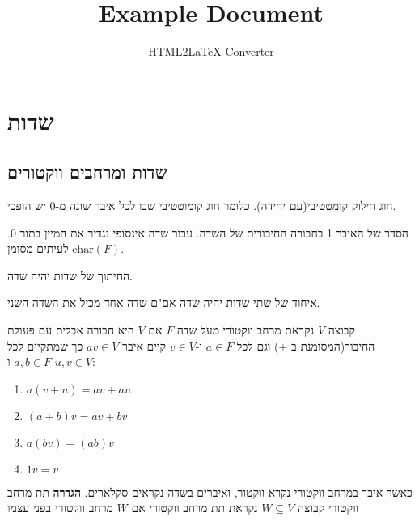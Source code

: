 \documentclass{tstextbook}
\begin{document}
\title{Example Document}
\author{HTML2LaTeX Converter}
\maketitle

\chapter{שדות}

\section{שדות ומרחבים ווקטורים}

\begin{definition}[שדה]
חוג חילוק קומטטיבי(עם יחידה). כלומר חוג קומוטטיבי שבו לכל איבר שונה מ-0 יש הופכי.

\end{definition}
\begin{definition}
הסדר של האיבר 1 בחבורה החיבורית של השדה. עבור שדה אינסופי נגדיר את המיין בתור 0. לעיתים מסומן \(\mathrm{char}(F)\).

\end{definition}
\begin{proposition}
החיתוך של שדות יהיה שדה.

\end{proposition}
\begin{proposition}
איחוד של שתי שדות יהיה שדה אם"ם שדה אחד מכיל את השדה השני.

\end{proposition}
\begin{definition}
קבוצה \(V\) נקראת מרחב ווקטורי מעל שדה \(F\) אם \(V\) היא חבורה אבלית עם פעולת החיבור(המסומנת ב \(+\)) וגם לכל \(a\in F\) ו-\(v \in V\) קיים איבר \(av \in V\) כך שמתקיים לכל \(a,b \in F\) ו-\(u,v \in V\):

  \begin{enumerate}
    \item \(a(v+u)=av+a u\)


    \item \((a+b)v=av+bv\)


    \item \(a(bv)=(a b)v\)


    \item \(1v=v\)


  \end{enumerate}
\end{definition}
כאשר איבר במרחב ווקטורי נקרא ווקטור, ואיברים בשדה נקראים סקלארים.
\textbf{הגדרה} תת מרחב ווקטורי
קבוצה \(W\subseteq V\) נקראת תת מרחב ווקטורי אם \(W\) מרחב ווקטורי בפני עצמו
\end{document}
